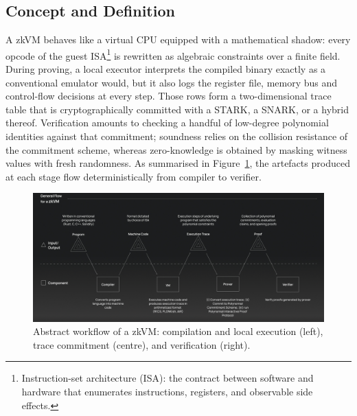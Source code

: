\subsection{Concept and Definition}
A zkVM behaves like a virtual CPU equipped with a mathematical shadow: every opcode of the guest ISA\footnote{Instruction-set architecture (ISA): the contract between software and hardware that enumerates instructions, registers, and observable side effects.} is rewritten as algebraic constraints over a finite field.  
During proving, a local executor interprets the compiled binary exactly as a conventional emulator would, but it also logs the register file, memory bus and control-flow decisions at every step.  
Those rows form a two-dimensional trace table that is cryptographically committed with a STARK, a SNARK, or a hybrid thereof.  
Verification amounts to checking a handful of low-degree polynomial identities against that commitment; soundness relies on the collision resistance of the commitment scheme, whereas zero-knowledge is obtained by masking witness values with fresh randomness.  
As summarised in Figure~\ref{fig:zkvm_workflow}, the artefacts produced at each stage flow deterministically from compiler to verifier.  

\begin{figure}[h]
  \centering
  \includegraphics[width=.95\linewidth]{Images/Chap1/zk_worflow.png}
  \caption{Abstract workflow of a zkVM: compilation and local execution (left), trace commitment (centre), and verification (right).\label{fig:zkvm_workflow}}
\end{figure}


